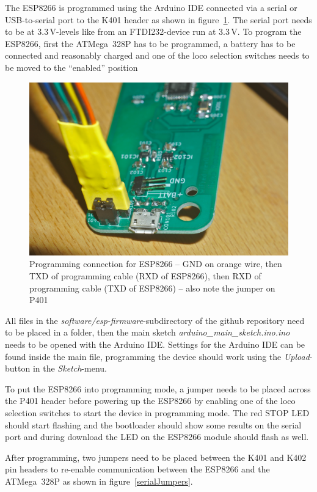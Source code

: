 \documentclass[11pt,a4paper]{scrartcl}
\begin{document}
The ESP8266 is programmed using the Arduino IDE connected via a serial or USB-to-serial port to the K401 header as shown in figure~\ref{progESP}. The serial port needs to be at 3.3\,V-levels like from an FTDI232-device run at 3.3\,V. To program the ESP8266, first the ATMega~328P has to be programmed, a battery has to be connected and reasonably charged and one of the loco selection switches needs to be moved to the ``enabled'' position

\begin{figure}[tbhp]
  \centering
  \includegraphics[width=0.8 \textwidth]{images/_DSC0138}
  \caption{Programming connection for ESP8266 -- GND on orange wire, then TXD of programming cable (RXD of ESP8266), then RXD of programming cable (TXD of ESP8266) -- also note the jumper on P401}
  \label{progESP}
\end{figure}

All files in the \textit{software/esp-firmware}-subdirectory of the github repository need to be placed in a folder, then the main sketch \textit{arduino\_main\_sketch.ino.ino} needs to be opened with the Arduino IDE. Settings for the Arduino IDE can be found inside the main file, programming the device should work using the \textit{Upload}-button in the \textit{Sketch}-menu.

To put the ESP8266 into programming mode, a jumper needs to be placed across the P401 header before powering up the ESP8266 by enabling one of the loco selection switches to start the device in programming mode. The red STOP LED should start flashing and the bootloader should show some results on the serial port and during download the LED on the ESP8266 module should flash as well.

After programming, two jumpers need to be placed between the K401 and K402 pin headers to re-enable communication between the ESP8266 and the ATMega~328P as shown in figure~\ref{serialJumpers}.
\end{document}

